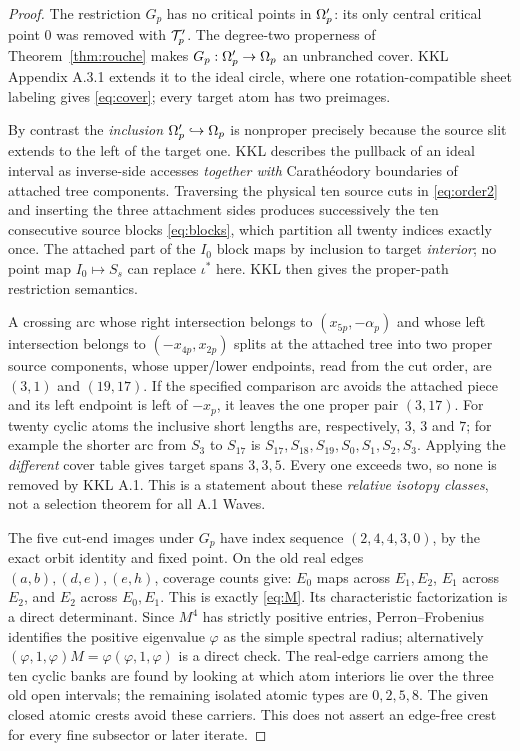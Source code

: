 \begin{proof}
The restriction $G_p$ has no
critical points in $\Omega'_p$:
its only central critical point
$0$ was removed with $\mathcal T'_p$.
The degree-two properness of
Theorem~\ref{thm:rouche} makes
$G_p:\Omega'_p\to\Omega_p$ an unbranched
cover.  KKL Appendix A.3.1
extends it to the ideal circle,
where one rotation-compatible
sheet labeling gives
\eqref{eq:cover}; every target
atom has two preimages.

By contrast the \emph{inclusion}
$\Omega'_p\hookrightarrow\Omega_p$
is nonproper precisely because
the source slit extends to the
left of the target one.  KKL
\cite[Proposition 6.5]{KKL2026}
describes the pullback of an
ideal interval as inverse-side
accesses \emph{together with}
Carath\'eodory boundaries of
attached tree components.
Traversing the physical
ten source cuts in
\eqref{eq:order2} and inserting
the three attachment sides
produces successively the
ten consecutive source blocks
\eqref{eq:blocks}, which
partition all twenty indices
exactly once.  The attached
part of the $I_0$ block
maps by inclusion to target
\emph{interior}; no point map
$I_0\mapsto S_s$ can replace
$\iota^*$ here.  KKL
\cite[Proposition 6.6 and
Appendix A.3.2--A.3.4]{KKL2026}
then gives the proper-path
restriction semantics.

A crossing arc whose right
intersection belongs to
$(x_{5p},-\alpha_p)$ and
whose left intersection belongs
to $(-x_{4p},x_{2p})$ splits
at the attached tree into two
proper source components, whose
upper/lower endpoints, read from
the cut order, are $(3,1)$ and
$(19,17)$.  If the specified
comparison arc avoids the attached
piece and its left endpoint is
left of $-x_p$, it leaves the
one proper pair $(3,17)$.
For twenty cyclic atoms the
inclusive short lengths are,
respectively, $3$, $3$ and $7$;
for example the shorter arc
from $S_3$ to $S_{17}$ is
$S_{17},S_{18},S_{19},S_0,S_1,S_2,S_3$.
Applying the \emph{different}
cover table gives target spans
$3,3,5$.  Every one exceeds two,
so none is removed by KKL A.1.
This is a statement about these
\emph{relative isotopy classes},
not a selection theorem for all
A.1 Waves.

The five cut-end images under
$G_p$ have index sequence
$(2,4,4,3,0)$, by the exact
orbit identity and fixed
point.  On the old real edges
$(a,b),(d,e),(e,h)$,
coverage counts give:
$E_0$ maps across $E_1,E_2$,
$E_1$ across $E_2$,
and $E_2$ across $E_0,E_1$.
This is exactly \eqref{eq:M}.
Its characteristic factorization
is a direct determinant.
Since $M^4$ has strictly
positive entries, Perron--Frobenius
\cite[Chapter XIII, \S2]{Gantmacher1959}
identifies the positive eigenvalue
$\varphi$ as the simple spectral
radius; alternatively
$(\varphi,1,\varphi)M
=\varphi(\varphi,1,\varphi)$
is a direct check.  The
real-edge carriers among the
ten cyclic banks are found
by looking at which atom
interiors lie over the three
old open intervals; the
remaining isolated atomic
types are $0,2,5,8$.
The given closed atomic crests
avoid these carriers.  This
does not assert an edge-free
crest for every fine
subsector or later iterate.
\end{proof}

